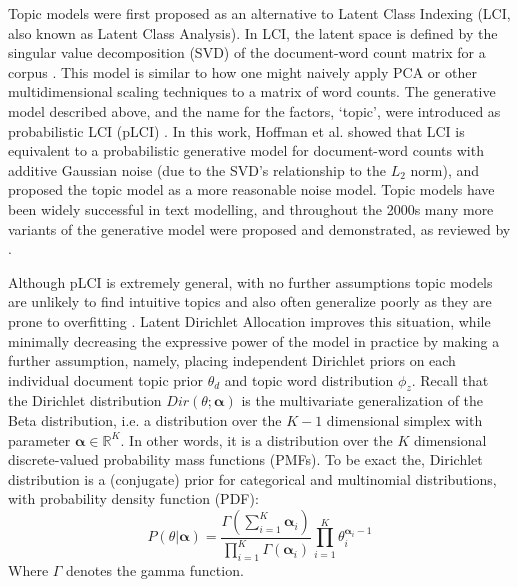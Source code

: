 Topic models were first proposed as an alternative to Latent Class Indexing (LCI, also known as Latent Class Analysis). In LCI, the latent space is defined by the singular value decomposition (SVD) of the document-word count matrix for a corpus \citep{Deerwester90indexingby}. This model is similar to how one might naively apply PCA or other multidimensional scaling techniques to a matrix of word counts. The generative model described above, and the name for the factors, `topic', were introduced as probabilistic LCI (pLCI) \citep{hofmann1999plsa}. In this work, Hoffman et al. showed that LCI is equivalent to a probabilistic generative model for document-word counts with additive Gaussian noise (due to the SVD's relationship to the $L_2$ norm), and proposed the topic model as a more reasonable noise model. Topic models have been widely successful in text modelling, and throughout the 2000s many more variants of the generative model were proposed and demonstrated, as reviewed by \citep{Blei2010}.


Although pLCI is extremely general, with no further assumptions topic models are unlikely to find intuitive topics and also often generalize poorly as they are prone to overfitting \citep{Blei2003}.
Latent Dirichlet Allocation improves this situation, while minimally decreasing the expressive power of the model in practice by making a further assumption, namely, placing independent Dirichlet priors on each individual document topic prior $\theta_d$ and topic word distribution $\phi_z$.
Recall that the Dirichlet distribution $Dir(\theta; \boldsymbol{\alpha})$ is the multivariate generalization of the Beta distribution, i.e. a distribution over the $K-1$ dimensional simplex with parameter $\boldsymbol{\alpha} \in \mathbb{R}^K$. In other words, it is a distribution over the $K$ dimensional discrete-valued probability mass functions (PMFs). To be exact the, Dirichlet distribution is a (conjugate) prior for categorical and multinomial distributions, with probability density function (PDF):
\begin{equation}
P(\theta|\boldsymbol{\alpha}) = \frac{\Gamma(\sum_{i=1}^{K} \boldsymbol{\alpha}_i)}{\prod_{i=1}^{K} \Gamma(\boldsymbol{\alpha}_i)} \prod_{i=1}^{K} \theta_i^{\boldsymbol{\alpha}_i -1}
\end{equation}
Where $\Gamma$ denotes the gamma function.

